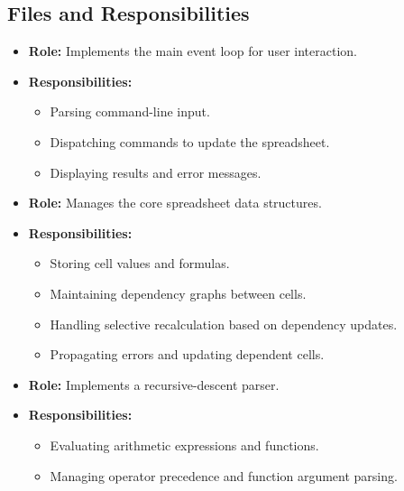 \documentclass[11pt,a4paper]{article}
\begin{document}
\subsection{Files and Responsibilities}
\begin{description}[noitemsep]
    \item[\texttt{main.c}] 
    \begin{itemize}[noitemsep]
        \item \textbf{Role:} Implements the main event loop for user interaction.
        \item \textbf{Responsibilities:} 
        \begin{itemize}[noitemsep]
            \item Parsing command-line input.
            \item Dispatching commands to update the spreadsheet.
            \item Displaying results and error messages.
        \end{itemize}
    \end{itemize}
    \item[\texttt{sheet.c/h}] 
    \begin{itemize}[noitemsep]
        \item \textbf{Role:} Manages the core spreadsheet data structures.
        \item \textbf{Responsibilities:} 
        \begin{itemize}[noitemsep]
            \item Storing cell values and formulas.
            \item Maintaining dependency graphs between cells.
            \item Handling selective recalculation based on dependency updates.
            \item Propagating errors and updating dependent cells.
        \end{itemize}
    \end{itemize}
    \item[\texttt{parser.c/h}] 
    \begin{itemize}[noitemsep]
        \item \textbf{Role:} Implements a recursive-descent parser.
        \item \textbf{Responsibilities:} 
        \begin{itemize}[noitemsep]
            \item Evaluating arithmetic expressions and functions.
            \item Managing operator precedence and function argument parsing.

\end{itemize}
\end{itemize}
\end{description}
\end{document}
